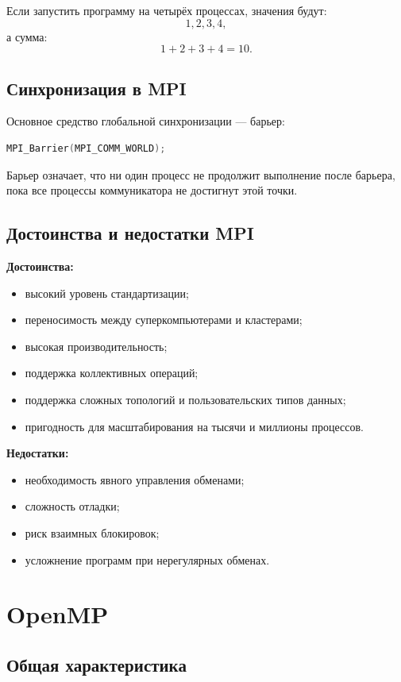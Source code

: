 \documentclass[12pt,a4paper]{article}
\begin{document}
Если запустить программу на четырёх процессах, значения будут:
\[
1,2,3,4,
\]
а сумма:
\[
1+2+3+4=10.
\]

\subsection{Синхронизация в MPI}

Основное средство глобальной синхронизации --- барьер:

\begin{lstlisting}[language=C]
MPI_Barrier(MPI_COMM_WORLD);
\end{lstlisting}

Барьер означает, что ни один процесс не продолжит выполнение после барьера, пока все процессы коммуникатора не достигнут этой точки.

\subsection{Достоинства и недостатки MPI}

\textbf{Достоинства:}
\begin{itemize}
    \item высокий уровень стандартизации;
    \item переносимость между суперкомпьютерами и кластерами;
    \item высокая производительность;
    \item поддержка коллективных операций;
    \item поддержка сложных топологий и пользовательских типов данных;
    \item пригодность для масштабирования на тысячи и миллионы процессов.
\end{itemize}

\textbf{Недостатки:}
\begin{itemize}
    \item необходимость явного управления обменами;
    \item сложность отладки;
    \item риск взаимных блокировок;
    \item усложнение программ при нерегулярных обменах.
\end{itemize}

\section{OpenMP}

\subsection{Общая характеристика}
\end{document}
